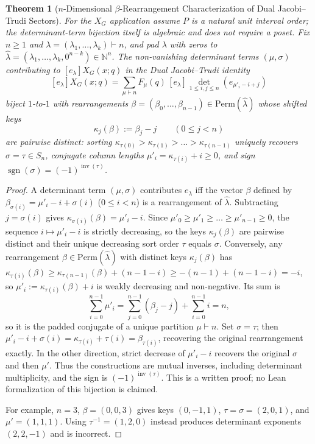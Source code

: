 \documentclass[11pt]{article}
\newtheorem{theorem}{Theorem}[section]
\theoremstyle{definition}
\newcommand{\N}{\mathbb{N}}
\begin{document}
\begin{theorem}[$n$-Dimensional $\beta$-Rearrangement Characterization of Dual Jacobi--Trudi Sectors]
\label{thm:beta-bijection}
For the $X_G$ application assume $P$ is a natural unit interval order; the determinant-term bijection itself is algebraic and does not require a poset. Fix $n \ge 1$ and $\lambda = (\lambda_1, \dots, \lambda_k) \vdash n$, and pad $\lambda$ with zeros to $\hat{\lambda} = (\lambda_1, \dots, \lambda_k, 0^{n-k}) \in \N^n$. The non-vanishing determinant terms $(\mu, \sigma)$ contributing to $[e_\lambda] X_G(x; q)$ in the Dual Jacobi--Trudi identity
\[
  [e_\lambda] X_G(x; q) = \sum_{\mu \vdash n} F_\mu(q)\, [e_\lambda] \det_{1 \le i,j \le n}(e_{\mu'_i - i + j})
\]
biject $1$-to-$1$ with rearrangements $\beta = (\beta_0, \dots, \beta_{n-1}) \in \mathrm{Perm}(\hat{\lambda})$ whose shifted keys
\[
  \kappa_j(\beta) := \beta_j - j \qquad (0 \le j < n)
\]
are pairwise distinct: sorting $\kappa_{\tau(0)} > \kappa_{\tau(1)} > \dots > \kappa_{\tau(n-1)}$ uniquely recovers $\sigma = \tau \in S_n$, conjugate column lengths $\mu'_i = \kappa_{\tau(i)} + i \ge 0$, and sign $\operatorname{sgn}(\sigma) = (-1)^{\operatorname{inv}(\tau)}$.
\end{theorem}
\begin{proof}
A determinant term $(\mu, \sigma)$ contributes $e_\lambda$ iff the vector $\beta$ defined by $\beta_{\sigma(i)} = \mu'_i - i + \sigma(i)$ ($0 \le i < n$) is a rearrangement of $\hat{\lambda}$. Subtracting $j = \sigma(i)$ gives $\kappa_{\sigma(i)}(\beta) = \mu'_i - i$. Since $\mu'_0 \ge \mu'_1 \ge \dots \ge \mu'_{n-1} \ge 0$, the sequence $i \mapsto \mu'_i - i$ is strictly decreasing, so the keys $\kappa_j(\beta)$ are pairwise distinct and their unique decreasing sort order $\tau$ equals $\sigma$. Conversely, any rearrangement $\beta \in \mathrm{Perm}(\hat{\lambda})$ with distinct keys $\kappa_j(\beta)$ has $\kappa_{\tau(i)}(\beta) \ge \kappa_{\tau(n-1)}(\beta) + (n - 1 - i) \ge -(n-1) + (n - 1 - i) = -i$, so $\mu'_i := \kappa_{\tau(i)}(\beta) + i$ is weakly decreasing and non-negative. Its sum is
\[
 \sum_{i=0}^{n-1}\mu'_i
 =\sum_{j=0}^{n-1}(\beta_j-j)+\sum_{i=0}^{n-1}i=n,
\]
so it is the padded conjugate of a unique partition $\mu\vdash n$. Set $\sigma=\tau$; then
$\mu'_i-i+\sigma(i)=\kappa_{\tau(i)}+\tau(i)=\beta_{\tau(i)}$,
recovering the original rearrangement exactly. In the other direction, strict decrease of $\mu'_i-i$ recovers the original $\sigma$ and then $\mu'$. Thus the constructions are mutual inverses, including determinant multiplicity, and the sign is $(-1)^{\operatorname{inv}(\tau)}$. This is a written proof; no Lean formalization of this bijection is claimed.

For example, $n=3$, $\beta=(0,0,3)$ gives keys $(0,-1,1)$, $\tau=\sigma=(2,0,1)$, and $\mu'=(1,1,1)$. Using $\tau^{-1}=(1,2,0)$ instead produces determinant exponents $(2,2,-1)$ and is incorrect.
\end{proof}
\end{document}
